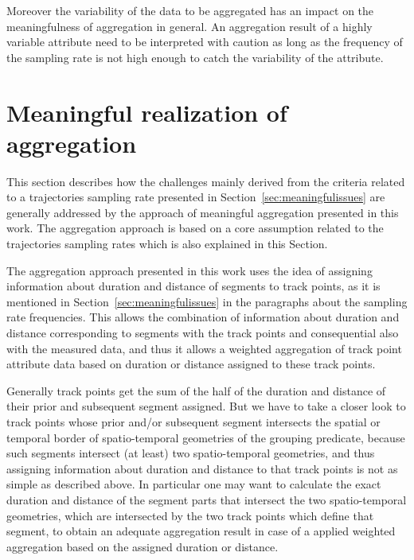 \documentclass[12pt, oneside, a4paper]{scrbook}
\begin{document}
Moreover the variability of the data to be aggregated has an impact on the meaningfulness of aggregation in general. An aggregation result of a highly variable attribute need to be interpreted with caution as long as the frequency of the sampling rate is not high enough to catch the variability of the attribute.
\par\medskip



\section{Meaningful realization of aggregation}
\label{sec:meaningfulrealization}

This section describes how the challenges mainly derived from the criteria related to a trajectories sampling rate presented in Section~\ref{sec:meaningfulissues} are generally addressed by the approach of meaningful aggregation presented in this work.
The aggregation approach is based on a core assumption related to the trajectories sampling rates which is also explained in this Section.
\par\medskip


The aggregation approach presented in this work uses the idea of assigning information about duration and distance of segments to track points, as it is mentioned in Section~\ref{sec:meaningfulissues} in the paragraphs about the sampling rate frequencies. 
This allows the combination of information about duration and distance corresponding to segments with the track points and consequential also with the measured data, and thus it allows a weighted aggregation of track point attribute data based on duration or distance assigned to these track points.
\par\medskip

Generally track points get the sum of the half of the duration and distance of their prior and subsequent segment assigned. 
But we have to take a closer look to track points whose prior and/or subsequent segment intersects the spatial or temporal border of spatio-temporal geometries of the grouping predicate, 
because such segments intersect (at least) two spatio-temporal geometries, and thus assigning information about duration and distance to that track points is not as simple as described above.
In particular one may want to calculate the exact duration and distance of the segment parts that intersect  the two spatio-temporal geometries, which are intersected by the two track points which define that segment, to obtain an adequate aggregation result in case of a applied weighted aggregation based on the assigned duration or distance.
\par\medskip
\end{document}
